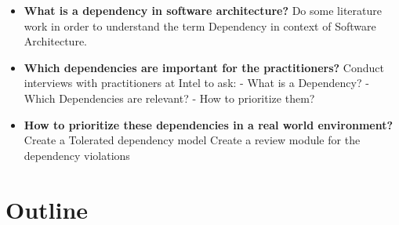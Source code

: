 \begin{itemize}
	\item \textbf{What is a dependency in software architecture?}\newline
				Do some literature work in order to understand the term Dependency in context of Software Architecture.
	\item \textbf{Which dependencies are important for the practitioners?} \newline
				Conduct interviews with practitioners at Intel to ask: \newline
				- What is a Dependency? \newline
				- Which Dependencies are relevant? \newline
				- How to prioritize them?	 
	\item \textbf{How to prioritize these dependencies in a real world environment?} \newline
				Create a Tolerated dependency model
				Create a review module for the dependency violations		
\end{itemize}

\section{Outline}